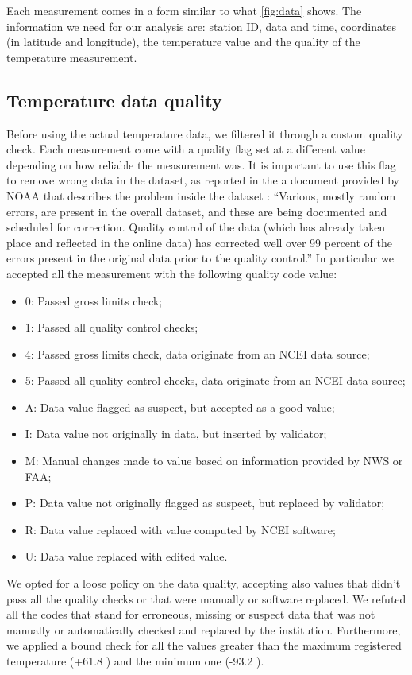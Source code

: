 \documentclass{vldb}
\begin{document}
Each measurement comes in a form similar to what \ref{fig:data} shows. The information we need for our analysis are: station ID, data and time, coordinates (in latitude and longitude), the temperature value and the quality of the temperature measurement.


\subsection{Temperature data quality}
\label{sec:filter}
Before using the actual temperature data, we filtered it through a custom quality check. Each measurement come with a quality flag set at a different value depending on how reliable the measurement was\cite{noaaDataFormat}.
It is important to use this flag to remove wrong data in the dataset, as reported in the a document provided by NOAA that describes the problem inside the dataset \cite{noaaProblems}: ``Various, mostly random errors, are present in the overall dataset, and these are being documented and scheduled for correction. Quality control of the data
(which has already taken place and reflected in the online data) has corrected
well over 99 percent of the errors present in the original data prior to the quality control.''
In particular we accepted all the measurement with the following quality code value:
\begin{itemize}
    \item 0: Passed gross limits check;
    \item 1: Passed all quality control checks;
    \item 4: Passed gross limits check, data originate from an NCEI data source;
    \item 5: Passed all quality control checks, data originate from an NCEI data source;
    \item A: Data value flagged as suspect, but accepted as a good value;
    \item I: Data value not originally in data, but inserted by validator;
    \item M: Manual changes made to value based on information provided by NWS or FAA;
    \item P: Data value not originally flagged as suspect, but replaced by validator;
    \item R: Data value replaced with value computed by NCEI software;
    \item U: Data value replaced with edited value.
\end{itemize}
We opted for a loose policy on the data quality, accepting also values that didn't pass all the quality checks or that were manually or software replaced. We refuted all the codes that stand for erroneous, missing or suspect data that was not manually or automatically checked and replaced by the institution. Furthermore, we applied a bound check for all the values greater than the maximum registered temperature (+61.8 \celsius) and the minimum one (-93.2 \celsius). \\
\end{document}
